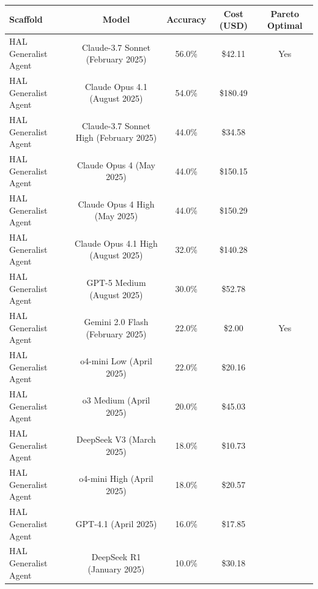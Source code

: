 \begin{tabular}{lcccc}
\toprule
Scaffold & Model & Accuracy & Cost (USD) & Pareto Optimal \\
\midrule
HAL Generalist Agent & Claude-3.7 Sonnet (February 2025) & 56.0\% & \$42.11 & Yes \\
HAL Generalist Agent & Claude Opus 4.1 (August 2025) & 54.0\% & \$180.49 &  \\
HAL Generalist Agent & Claude-3.7 Sonnet High (February 2025) & 44.0\% & \$34.58 &  \\
HAL Generalist Agent & Claude Opus 4 (May 2025) & 44.0\% & \$150.15 &  \\
HAL Generalist Agent & Claude Opus 4 High (May 2025) & 44.0\% & \$150.29 &  \\
HAL Generalist Agent & Claude Opus 4.1 High (August 2025) & 32.0\% & \$140.28 &  \\
HAL Generalist Agent & GPT-5 Medium (August 2025) & 30.0\% & \$52.78 &  \\
HAL Generalist Agent & Gemini 2.0 Flash (February 2025) & 22.0\% & \$2.00 & Yes \\
HAL Generalist Agent & o4-mini Low (April 2025) & 22.0\% & \$20.16 &  \\
HAL Generalist Agent & o3 Medium (April 2025) & 20.0\% & \$45.03 &  \\
HAL Generalist Agent & DeepSeek V3 (March 2025) & 18.0\% & \$10.73 &  \\
HAL Generalist Agent & o4-mini High (April 2025) & 18.0\% & \$20.57 &  \\
HAL Generalist Agent & GPT-4.1 (April 2025) & 16.0\% & \$17.85 &  \\
HAL Generalist Agent & DeepSeek R1 (January 2025) & 10.0\% & \$30.18 &  \\
\bottomrule
\end{tabular}